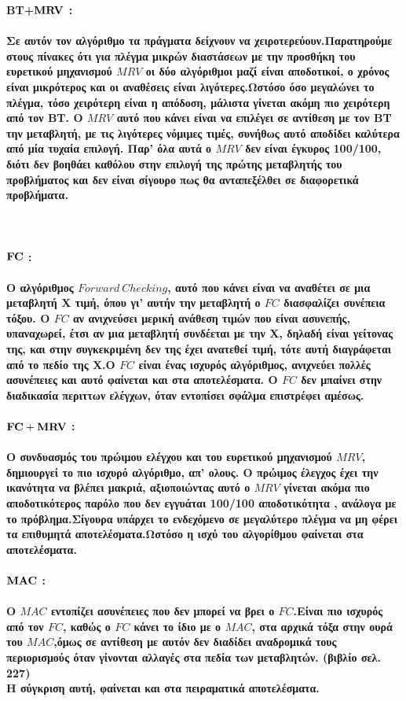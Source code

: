 \documentclass[10pt]{article}
\begin{document}
\bf ΒΤ+$ \bf MRV$ \normalfont: \\ \\
Σε αυτόν τον αλγόριθμο τα πράγματα δείχνουν να χειροτερεύουν.Παρατηρούμε στους πίνακες ότι για πλέγμα μικρών διαστάσεων με την προσθήκη του ευρετικού μηχανισμού $MRV$ οι δύο αλγόριθμοι μαζί είναι αποδοτικοί, ο χρόνος είναι μικρότερος και οι αναθέσεις είναι λιγότερες.Ωστόσο όσο μεγαλώνει το πλέγμα, τόσο χειρότερη είναι η απόδοση, μάλιστα γίνεται ακόμη πιο χειρότερη από τον ΒΤ. Ο $MRV$ αυτό που κάνει είναι να επιλέγει σε αντίθεση με τον ΒΤ την μεταβλητή, με τις λιγότερες νόμιμες τιμές, συνήθως αυτό αποδίδει καλύτερα από μία τυχαία επιλογή. Παρ’ όλα αυτά ο $MRV$ δεν είναι έγκυρος 100/100, διότι δεν βοηθάει καθόλου στην επιλογή της πρώτης μεταβλητής του προβλήματος και δεν είναι σίγουρο πως θα ανταπεξέλθει σε διαφορετικά προβλήματα. \\ \\ \\ \\

\bf $ \bf FC$ \normalfont: \\ \\
Ο αλγόριθμος $Forward \ Checking$, αυτό που κάνει είναι να αναθέτει σε μια μεταβλητή Χ τιμή, όπου γι’ αυτήν την  μεταβλητή ο $FC$ διασφαλίζει συνέπεια τόξου. Ο $FC$ αν ανιχνεύσει μερική ανάθεση τιμών που είναι ασυνεπής, υπαναχωρεί, έτσι αν μια μεταβλητή συνδέεται με την Χ, δηλαδή είναι γείτονας της, και στην συγκεκριμένη δεν της έχει ανατεθεί τιμή, τότε αυτή διαγράφεται από το πεδίο της Χ.Ο $FC$ είναι ένας ισχυρός αλγόριθμος, ανιχνεύει πολλές ασυνέπειες και αυτό φαίνεται και στα αποτελέσματα. Ο $FC$ δεν μπαίνει στην διαδικασία περιττων ελέγχων, όταν εντοπίσει σφάλμα επιστρέφει αμέσως.\\ \\

\bf $ \bf FC+MRV$ \normalfont: \\ \\
Ο συνδυασμός του πρώιμου ελέγχου και του ευρετικού μηχανισμού $MRV$, δημιουργεί το πιο ισχυρό αλγόριθμο, απ’ ολους. Ο πρώιμος έλεγχος έχει την ικανότητα να βλέπει μακριά,  αξιοποιώντας αυτό ο  $MRV$ γίνεται ακόμα πιο αποδοτικότερος παρόλο που δεν εγγυάται 100/100 αποδοτικότητα , ανάλογα με το πρόβλημα.Σίγουρα υπάρχει το ενδεχόμενο σε μεγαλύτερο πλέγμα να μη φέρει τα επιθυμητά αποτελέσματα.Ωστόσο η ισχύ του αλγορίθμου φαίνεται στα αποτελέσματα.\\ \\

\bf $ \bf MAC$ \normalfont: \\ \\
Ο $MAC$ εντοπίζει ασυνέπειες που δεν μπορεί να βρει ο $FC$.Είναι πιο ισχυρός από τον   $FC$, καθώς ο  $FC$ κάνει το ίδιο με ο $MAC$, στα αρχικά τόξα στην ουρά του $MAC$,όμως σε αντίθεση με αυτόν δεν διαδίδει αναδρομικά τους περιορισμούς όταν γίνονται αλλαγές  στα πεδία των μεταβλητών. (βιβλίο σελ. 227)\\
Η σύγκριση αυτή, φαίνεται και στα πειραματικά αποτελέσματα. \\
\end{document}
